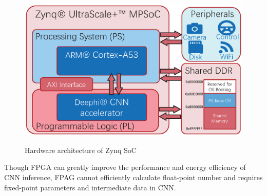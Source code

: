 \begin{figure}[thb]  
    \centering  
    {\includegraphics[width=0.95\linewidth]{fig/plps.eps}\label{fig:plps}} 
    \caption{Hardware architecture of Zynq SoC}
\end{figure}

Though FPGA can greatly improve the performance and energy efficiency of CNN inference, FPAG cannot efficiently calculate float-point number and requires fixed-point parameters and intermediate data in CNN.